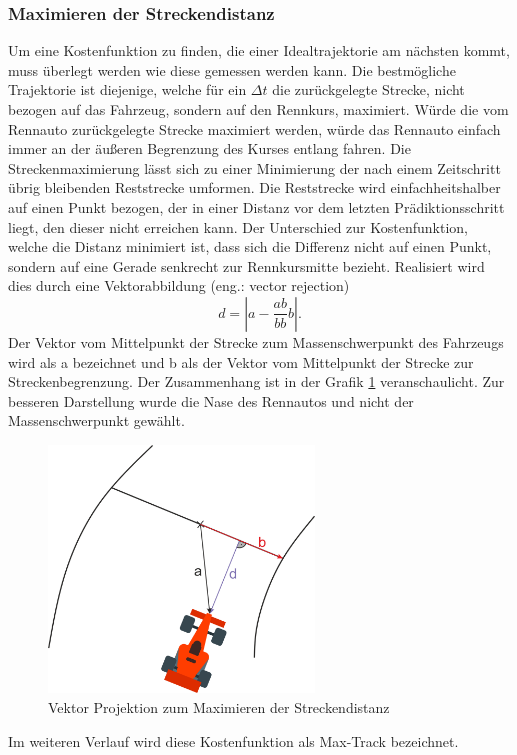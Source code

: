 \documentclass{like}
\begin{document}
\subsubsection*{Maximieren der Streckendistanz}
Um eine Kostenfunktion zu finden, die einer Idealtrajektorie am nächsten kommt, muss überlegt werden wie diese gemessen werden kann. Die bestmögliche Trajektorie ist diejenige, welche für ein $\Delta t$ die zurückgelegte Strecke, nicht bezogen auf das Fahrzeug, sondern auf den Rennkurs, maximiert. Würde die vom Rennauto zurückgelegte Strecke maximiert werden, würde das Rennauto einfach immer an der äußeren Begrenzung des Kurses entlang fahren. Die Streckenmaximierung lässt sich zu einer Minimierung der nach einem Zeitschritt übrig bleibenden Reststrecke umformen. Die Reststrecke wird einfachheitshalber auf einen Punkt bezogen, der in einer Distanz vor dem letzten Prädiktionsschritt liegt, den dieser nicht erreichen kann. Der Unterschied zur Kosten\-funk\-ti\-on, welche die Distanz minimiert ist, dass sich die Differenz nicht auf einen Punkt, sondern auf eine Gerade senkrecht zur Rennkursmitte bezieht.
Realisiert wird dies durch eine Vektorabbildung (eng.: vector rejection)
\begin{equation}
	d = |a - \frac{ab}{bb}b|.
\end{equation}
Der Vektor vom Mittelpunkt der Strecke zum Massenschwerpunkt des Fahrzeugs wird als a bezeichnet und b als der Vektor vom Mittelpunkt der Strecke zur Streckenbegrenzung.
Der Zusammenhang ist in der Grafik \ref{fig:maxDist}  veranschaulicht. Zur besseren Darstellung wurde die Nase des Rennautos und nicht der Massenschwerpunkt gewählt.

\begin{figure}[ht!]
	\centering
	\includegraphics[width=200pt]{Abbildungen/vektorRejection.png}
	\caption{Vektor Projektion zum Maximieren der Streckendistanz}
	\label{fig:maxDist}
\end{figure}
Im weiteren Verlauf wird diese Kostenfunktion als Max-Track bezeichnet.
\end{document}
